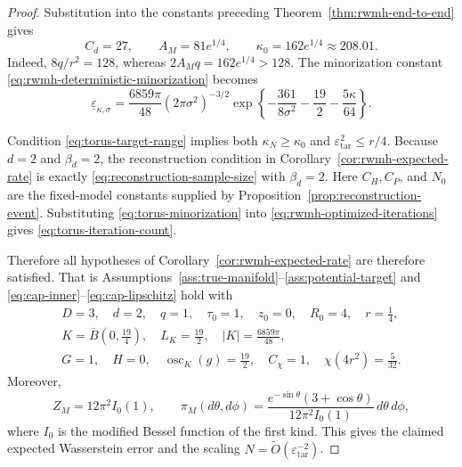 \documentclass{article}
\newcommand{\osc}{\operatorname{osc}}
\numberwithin{equation}{section}
\newcommand{\eps}{\varepsilon}
\renewcommand{\epsilon}{\eps}
\begin{document}
\begin{proof}
Substitution into the constants preceding
Theorem~\ref{thm:rwmh-end-to-end} gives
\begin{equation}
 C_d=27,
 \qquad
 A_M=81e^{1/4},
 \qquad
 \kappa_0=162e^{1/4}\approx208.01.
\label{eq:torus-analysis-constants}
\end{equation}
Indeed, $8q/r^2=128$, whereas $2A_Mq=162e^{1/4}>128$.
The minorization constant \eqref{eq:rwmh-deterministic-minorization} becomes
\begin{equation}
 \underline\varepsilon_{\kappa,\sigma}
 =\frac{6859\pi}{48}(2\pi\sigma^2)^{-3/2}
 \exp\left\{
 -\frac{361}{8\sigma^2}-\frac{19}{2}-\frac{5\kappa}{64}
 \right\}.
\label{eq:torus-minorization}
\end{equation}

Condition \eqref{eq:torus-target-range} implies both
$\kappa_N\ge\kappa_0$ and $\epsilon_{\mathrm{tar}}^2\le r/4$.
Because $d=2$ and $\beta_d=2$, the reconstruction condition in
Corollary~\ref{cor:rwmh-expected-rate} is exactly
\eqref{eq:reconstruction-sample-size} with $\beta_d=2$. Here $C_H,C_P$,
and $N_0$ are the fixed-model constants supplied by
Proposition~\ref{prop:reconstruction-event}.
Substituting \eqref{eq:torus-minorization} into
\eqref{eq:rwmh-optimized-iterations} gives
\eqref{eq:torus-iteration-count}.

Therefore all hypotheses of
Corollary~\ref{cor:rwmh-expected-rate} are therefore satisfied. That is 
Assumptions~\ref{ass:true-manifold}--\ref{ass:potential-target} and
\eqref{eq:cap-inner}--\eqref{eq:cap-lipschitz} hold with
\begin{equation}
 \begin{gathered}
 D=3,\quad d=2,\quad q=1,\quad \tau_0=1,\quad z_0=0,
 \quad R_0=4,\quad r=\frac14,\\
 K=\overline B\left(0,\frac{19}{4}\right),\quad
 L_K=\frac{19}{2},\quad |K|=\frac{6859\pi}{48},\\
 G=1,\quad H=0,\quad \osc_K(g)=\frac{19}{2},\quad
 C_\chi=1,\quad \chi(4r^2)=\frac{5}{32}.
 \end{gathered}
\label{eq:torus-model-constants}
\end{equation}
Moreover,
\[
 Z_M=12\pi^2I_0(1),
 \qquad
 \pi_M(d\theta,d\phi)
 =\frac{e^{-\sin\theta}(3+\cos\theta)}
 {12\pi^2I_0(1)}\,d\theta\,d\phi,
\]
where $I_0$ is the modified Bessel function of the first kind.
This gives the claimed expected Wasserstein error and the scaling
$N=\widetilde O(\epsilon_{\mathrm{tar}}^{-2})$.
\end{proof}



\end{document}
